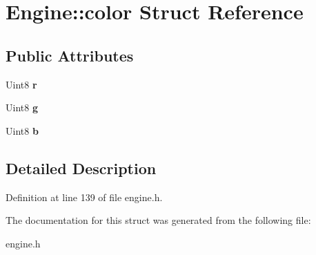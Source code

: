 \hypertarget{structEngine_1_1color}{}\section{Engine\+:\+:color Struct Reference}
\label{structEngine_1_1color}
\subsection*{Public Attributes}
\begin{DoxyCompactItemize}
\item 
Uint8 {\bfseries r}\hypertarget{structEngine_1_1color_ad2f4cb4cb1d9b251100bd1a4ebfa6b1e}{}\label{structEngine_1_1color_ad2f4cb4cb1d9b251100bd1a4ebfa6b1e}

\item 
Uint8 {\bfseries g}\hypertarget{structEngine_1_1color_a3e4b52509fd71e8551d297cd87073af4}{}\label{structEngine_1_1color_a3e4b52509fd71e8551d297cd87073af4}

\item 
Uint8 {\bfseries b}\hypertarget{structEngine_1_1color_a2c684bfdca0608a79500f714671b97e9}{}\label{structEngine_1_1color_a2c684bfdca0608a79500f714671b97e9}

\end{DoxyCompactItemize}


\subsection{Detailed Description}


Definition at line 139 of file engine.\+h.



The documentation for this struct was generated from the following file\+:\begin{DoxyCompactItemize}
\item 
engine.\+h\end{DoxyCompactItemize}
